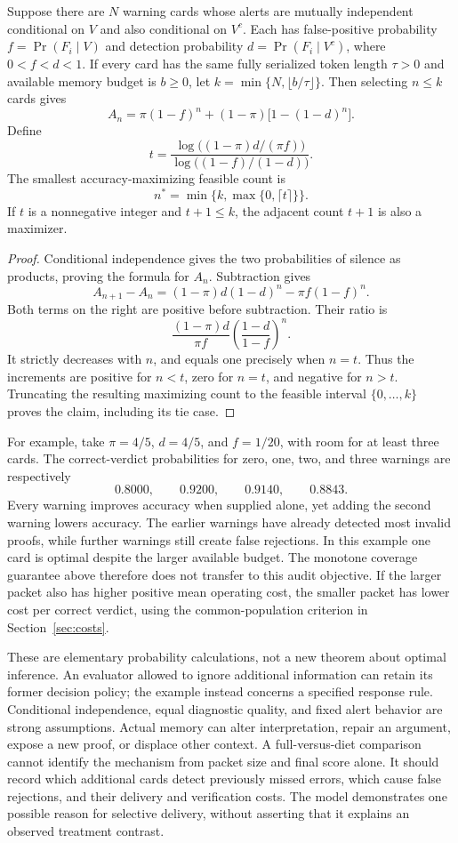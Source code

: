 \begin{proposition}
Suppose there are $N$ warning cards whose alerts are mutually independent conditional on $V$ and also conditional on $V^c$. Each has false-positive probability $f=\Pr(F_i\mid V)$ and detection probability $d=\Pr(F_i\mid V^c)$, where $0<f<d<1$. If every card has the same fully serialized token length $\tau>0$ and available memory budget is $b\geq0$, let $k=\min\{N,\lfloor b/\tau\rfloor\}$. Then selecting $n\leq k$ cards gives
\[
 A_n=\pi(1-f)^n+(1-\pi)\bigl[1-(1-d)^n\bigr].
\]
Define
\[
 t=\frac{\log\!\bigl((1-\pi)d/(\pi f)\bigr)}
 {\log\!\bigl((1-f)/(1-d)\bigr)}.
\]
The smallest accuracy-maximizing feasible count is
\[
 n^\ast=\min\{k,\max\{0,\lceil t\rceil\}\}.
\]
If $t$ is a nonnegative integer and $t+1\leq k$, the adjacent count $t+1$ is also a maximizer.
\end{proposition}
\begin{proof}
Conditional independence gives the two probabilities of silence as products, proving the formula for $A_n$. Subtraction gives
\[
 A_{n+1}-A_n
 =(1-\pi)d(1-d)^n-\pi f(1-f)^n.
\]
Both terms on the right are positive before subtraction. Their ratio is
\[
 \frac{(1-\pi)d}{\pi f}
 \left(\frac{1-d}{1-f}\right)^n.
\]
It strictly decreases with $n$, and equals one precisely when $n=t$. Thus the increments are positive for $n<t$, zero for $n=t$, and negative for $n>t$. Truncating the resulting maximizing count to the feasible interval $\{0,\ldots,k\}$ proves the claim, including its tie case.
\end{proof}

For example, take $\pi=4/5$, $d=4/5$, and $f=1/20$, with room for at least three cards. The correct-verdict probabilities for zero, one, two, and three warnings are respectively
\[
 0.8000,\qquad 0.9200,\qquad 0.9140,\qquad 0.8843.
\]
Every warning improves accuracy when supplied alone, yet adding the second warning lowers accuracy. The earlier warnings have already detected most invalid proofs, while further warnings still create false rejections. In this example one card is optimal despite the larger available budget. The monotone coverage guarantee above therefore does not transfer to this audit objective. If the larger packet also has higher positive mean operating cost, the smaller packet has lower cost per correct verdict, using the common-population criterion in Section~\ref{sec:costs}.

These are elementary probability calculations, not a new theorem about optimal inference. An evaluator allowed to ignore additional information can retain its former decision policy; the example instead concerns a specified response rule. Conditional independence, equal diagnostic quality, and fixed alert behavior are strong assumptions. Actual memory can alter interpretation, repair an argument, expose a new proof, or displace other context. A full-versus-diet comparison cannot identify the mechanism from packet size and final score alone. It should record which additional cards detect previously missed errors, which cause false rejections, and their delivery and verification costs. The model demonstrates one possible reason for selective delivery, without asserting that it explains an observed treatment contrast.

